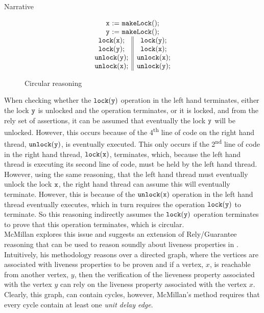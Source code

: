 \documentclass{article}
\begin{document}
\begin{section}{Narrative}
  \begin{figure}
    \[
    \begin{array}{c}
      \mathtt{x} \mathtt{\ :=\ } \mathtt{makeLock}(); \\
      \mathtt{y} \mathtt{\ :=\ } \mathtt{makeLock}(); \\
      \begin{array}{c || c}
        \mathtt{lock}(\mathtt{x}); & \mathtt{lock}(\mathtt{y}); \\
        \mathtt{lock}(\mathtt{y}); & \mathtt{lock}(\mathtt{x}); \\
        \mathtt{unlock}(\mathtt{y}); & \mathtt{unlock}(\mathtt{x}); \\
        \mathtt{unlock}(\mathtt{x}); & \mathtt{unlock}(\mathtt{y});
      \end{array}
    \end{array}
    \]
    \caption{Circular reasoning}
    \label{NaiveTotalRGCircular}
  \end{figure}

  When checking whether the $\mathtt{lock}(\mathtt{y})$ operation in the left hand terminates, either the lock $\mathtt{y}$ is unlocked and the operation terminates, or it is locked, and from the rely set of assertions, it can be assumed that eventually the lock $\mathtt{y}$ will be unlocked. However, this occurs because of the 4\textsuperscript{th} line of code on the right hand thread, $\mathtt{unlock}(\mathtt{y})$, is eventually executed. This only occurs if the 2\textsuperscript{nd} line of code in the right hand thread, $\mathtt{lock}(\mathtt{x})$, terminates, which, because the left hand thread is executing its second line of code, must be held by the left hand thread. However, using the same reasoning, that the left hand thread must eventually unlock the lock $\mathtt{x}$, the right hand thread can assume this will eventually terminate. However, this is because of the $\mathtt{unlock}(\mathtt{x})$ operation in the left hand thread eventually executes, which in turn requires the operation $\mathtt{lock}(\mathtt{y})$ to terminate. So this reasoning indirectly assumes the $\mathtt{lock}(\mathtt{y})$ operation terminates to prove that this operation terminates, which is circular. \\

  McMillan explores this issue and suggests an extension of Rely/Guarantee reasoning that can be used to reason soundly about liveness properties in \cite{McMillan}. Intuitively, his methodology reasons over a directed graph, where the vertices are associated with liveness properties to be proven and if a vertex, $x$, is reachable from another vertex, $y$, then the verification of the lieveness property associated with the vertex $y$ can rely on the liveness property associated with the vertex $x$. Clearly, this graph, can contain cycles, however, McMillan's method requires that every cycle contain at least one \emph{unit delay edge}.\\


\end{section}
\end{document}
